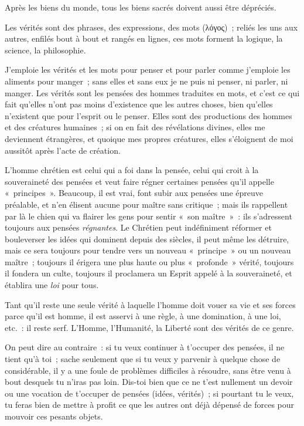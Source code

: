 \documentclass[french,twoside]{book} %
\begin{document}
Après les biens du monde, tous les biens sacrés doivent aussi être dépréciés.\par
Les vérités sont des phrases, des expressions, des mots (λόγος) ; reliés les uns aux autres, enfilés bout à  bout et rangés en lignes, ces mots forment la logique, la science, la philosophie.\par
J’emploie les vérités et les mots pour penser et pour parler comme j’emploie les aliments pour manger ; sans elles et sans eux je ne puis ni penser, ni parler, ni manger. Les vérités sont les pensées des hommes traduites en mots, et c’est ce qui fait qu’elles n’ont pas moins d’existence que les autres choses, bien qu’elles n’existent que pour l’esprit ou le penser. Elles sont des productions des hommes et des créatures humaines ; si on en fait des révélations divines, elles me deviennent étrangères, et quoique mes propres créatures, elles s’éloignent de moi aussitôt après l’acte de création.\par
L’homme chrétien est celui qui a foi dans la pensée, celui qui croit à la souveraineté des pensées et veut faire régner certaines pensées qu’il appelle « principes ». Beaucoup, il est vrai, font subir aux pensées une épreuve préalable, et n’en élisent aucune pour maître sans critique ; mais ils rappellent par là le chien qui va flairer les gens pour sentir « son maître » : ils s’adressent toujours aux pensées \emph{régnantes}. Le Chrétien peut indéfiniment réformer et bouleverser les idées qui dominent depuis des siècles, il peut même les détruire, mais ce sera toujours pour tendre vers un nouveau « principe » ou un nouveau maître ; toujours il érigera une plus haute ou plus « profonde » vérité, toujours il fondera un culte, toujours il proclamera un Esprit appelé à la souveraineté, et établira une \emph{loi} pour tous.\par
Tant qu’il reste une seule vérité à laquelle l’homme doit vouer sa vie et ses forces parce qu’il est homme, il est asservi à une règle, à une domination, à une loi, etc. : il reste serf. L’Homme, l’Humanité, la Liberté sont des vérités de ce genre.\par
On peut dire au contraire : si tu veux continuer à t’occuper des pensées, il ne tient qu’à toi ; sache seulement que si tu veux y parvenir à quelque chose de  considérable, il y a une foule de problèmes difficiles à résoudre, sans être venu à bout desquels tu n’iras pas loin. Dis-toi bien que ce ne t’est nullement un devoir ou une vocation de t’occuper de pensées (idées, vérités) ; si pourtant tu le veux, tu feras bien de mettre à profit ce que les autres ont déjà dépensé de forces pour mouvoir ces pesants objets.\par
\end{document}
